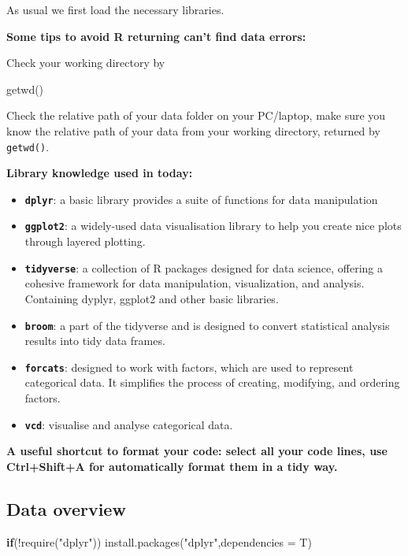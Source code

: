 \documentclass[
  letterpaper,
  DIV=11,
  numbers=noendperiod]{scrreprt}
\newenvironment{Shaded}{\begin{snugshade}}{\end{snugshade}}
\newcommand{\AttributeTok}[1]{\textcolor[rgb]{0.40,0.45,0.13}{#1}}
\newcommand{\ControlFlowTok}[1]{\textcolor[rgb]{0.00,0.23,0.31}{\textbf{#1}}}
\newcommand{\FunctionTok}[1]{\textcolor[rgb]{0.28,0.35,0.67}{#1}}
\newcommand{\NormalTok}[1]{\textcolor[rgb]{0.00,0.23,0.31}{#1}}
\newcommand{\SpecialCharTok}[1]{\textcolor[rgb]{0.37,0.37,0.37}{#1}}
\newcommand{\StringTok}[1]{\textcolor[rgb]{0.13,0.47,0.30}{#1}}
\begin{document}
As usual we first load the necessary libraries.

\textbf{Some tips to avoid R returning can't find data errors:}

Check your working directory by

\begin{Shaded}
\begin{Highlighting}[]
\FunctionTok{getwd}\NormalTok{()}
\end{Highlighting}
\end{Shaded}

Check the relative path of your data folder on your PC/laptop, make sure
you know the relative path of your data from your working directory,
returned by \texttt{getwd()}.

\textbf{Library knowledge used in today:}

\begin{itemize}
\item
  \textbf{\texttt{dplyr}}: a basic library provides a suite of functions
  for data manipulation
\item
  \textbf{\texttt{ggplot2}}: a widely-used data visualisation library to
  help you create nice plots through layered plotting.
\item
  \textbf{\texttt{tidyverse}}: a collection of R packages designed for
  data science, offering a cohesive framework for data manipulation,
  visualization, and analysis. Containing dyplyr, ggplot2 and other
  basic libraries.
\item
  \textbf{\texttt{broom}}: a part of the tidyverse and is designed to
  convert statistical analysis results into tidy data frames.
\item
  \textbf{\texttt{forcats}}: designed to work with factors, which are
  used to represent categorical data. It simplifies the process of
  creating, modifying, and ordering factors.
\item
  \textbf{\texttt{vcd}}: visualise and analyse categorical data.
\end{itemize}

\textbf{A useful shortcut to format your code: select all your code
lines, use Ctrl+Shift+A for automatically format them in a tidy way.}

\subsection{Data overview}\label{data-overview}

\begin{Shaded}
\begin{Highlighting}[]
\ControlFlowTok{if}\NormalTok{(}\SpecialCharTok{!}\FunctionTok{require}\NormalTok{(}\StringTok{"dplyr"}\NormalTok{))}
  \FunctionTok{install.packages}\NormalTok{(}\StringTok{"dplyr"}\NormalTok{,}\AttributeTok{dependencies =}\NormalTok{ T)}
\end{Highlighting}
\end{Shaded}
\end{document}
